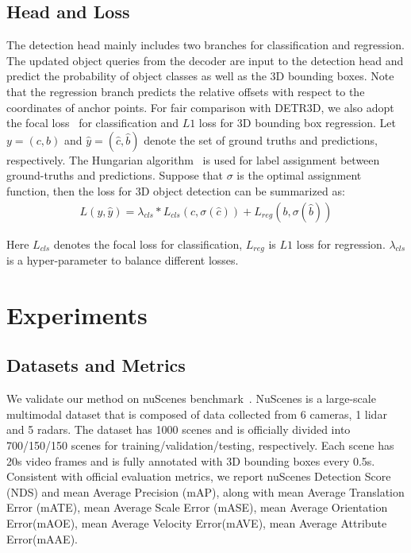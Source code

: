 \documentclass[runningheads]{llncs}
\begin{document}
\subsection{Head and Loss} The detection head mainly includes two branches for classification and regression. The updated object queries from the decoder are input to the detection head and predict the probability of object classes as well as the 3D bounding boxes. 
Note that the regression branch predicts the relative offsets with respect to the coordinates of anchor points. For fair comparison with DETR3D, we also adopt the focal loss~\cite{lin2017focal} for classification and $L1$ loss for 3D bounding box regression. 
Let $y = (c,b)$ and $\hat{y} = (\hat{c},\hat{b})$ denote the set of ground truths and predictions, respectively. The Hungarian algorithm~\cite{kuhn1955hungarian} is used for label assignment between ground-truths and predictions. Suppose that $\sigma$ is the optimal assignment function, then the loss for 3D object detection can be summarized as:
\begin{equation}\label{eq5}
\begin{aligned}
L(y,\hat{y}) = \lambda_{cls} * L_{cls}(c,\sigma(\hat{c})) + L_{reg}(b,\sigma(\hat{b}))
\end{aligned}
\end{equation}

Here $L_{cls}$ denotes the focal loss for classification, $L_{reg}$ is $L1$ loss for regression. $\lambda_{cls}$ is a hyper-parameter to balance different losses.

\section{Experiments}
\subsection{Datasets and Metrics}
We validate our method on nuScenes benchmark~\cite{caesar2020nuscenes}. NuScenes is a large-scale multimodal dataset that is composed of data collected from 6 cameras, 1 lidar and 5 radars. The dataset has 1000 scenes and is officially divided into 700/150/150 scenes for training/validation/testing, respectively. Each scene has 20s video frames and is fully annotated with 3D bounding boxes every 0.5s. Consistent with official evaluation metrics, we report nuScenes Detection Score (NDS) and mean Average Precision (mAP), along with mean Average Translation Error (mATE), mean Average Scale Error (mASE), mean Average Orientation Error(mAOE), mean Average
Velocity Error(mAVE), mean Average Attribute Error(mAAE). 
\end{document}

